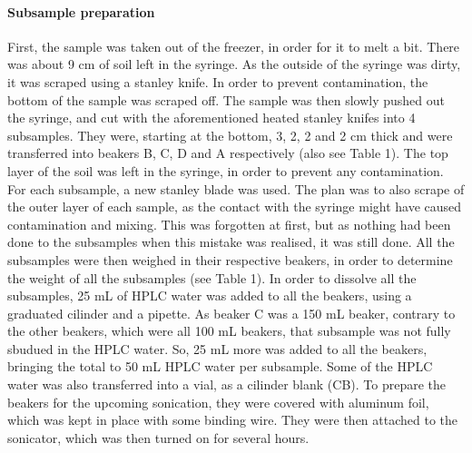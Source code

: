 \documentclass[twocolumn,a4paper,aps,amsmath,amssymb,floatfix,superscriptaddress]{revtex4-2}
\begin{document}
	\paragraph{Subsample preparation}
	First, the sample was taken out of the freezer, in order for it to melt a bit. There was about 9 cm of soil left in the syringe. As the outside of the syringe was dirty, it was scraped using a stanley knife. In order to prevent contamination, the bottom of the sample was scraped off. 
	The sample was then slowly pushed out the syringe, and cut with the aforementioned heated stanley knifes into 4 subsamples. They were, starting at the bottom, 3, 2, 2 and 2 cm thick and were transferred into beakers B, C, D and A respectively (also see Table 1). The top layer of the soil was left in the syringe, in order to prevent any contamination. For each subsample, a new stanley blade was used. The plan was to also scrape of the outer layer of each sample, as the contact with the syringe might have caused contamination and mixing. This was forgotten at first, but as nothing had been done to the subsamples when this mistake was realised, it was still done. All the subsamples were then weighed in their respective beakers, in order to determine the weight of all the subsamples (see Table 1). 
	In order to dissolve all the subsamples, 25 mL of HPLC water was added to all the beakers, using a graduated cilinder and a pipette. As beaker C was a 150 mL beaker, contrary to the other beakers, which were all 100 mL beakers, that subsample was not fully sbudued in the HPLC water. So, 25 mL more was added to all the beakers, bringing the total to 50 mL HPLC water per subsample. Some of the HPLC water was also transferred into a vial, as a cilinder blank (CB).
	To prepare the beakers for the upcoming sonication, they were covered with aluminum foil, which was kept in place with some binding wire. They were then attached to the sonicator, which was then turned on for several hours.
	
\end{document}
